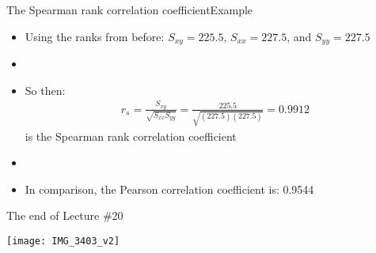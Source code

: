 \documentclass[xcolor=dvipsnames]{beamer}
\begin{document}
\begin{frame}{The Spearman rank correlation coefficient}{Example}
	\begin{itemize}
		\item Using the ranks from before: $S_{xy} = 225.5$, $S_{xx}=227.5$, and $S_{yy}=227.5$ \pause
		\item[]
		\item So then: \pause
		\begin{gather*}
			r_{s}=\frac{S_{xy}}{\sqrt{S_{xx}S_{yy}}} = \frac{225.5}{\sqrt{(227.5)(227.5)}} = 0.9912
		\end{gather*} 
		is the Spearman rank correlation coefficient \pause
		\item[]
		\item In comparison, the Pearson correlation coefficient is: 0.9544
	\end{itemize}
\end{frame}

\begin{frame}{The end of Lecture \#20}
	\begin{center}
		\texttt{[image: IMG\_3403\_v2]}
	\end{center}
\end{frame}
\end{document}
